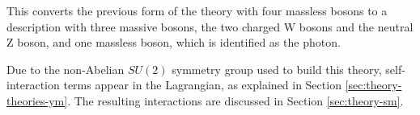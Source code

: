 This converts the previous form of the theory with four massless bosons to a
description with three massive bosons, the two charged W bosons and the
neutral Z boson, and one massless boson, which is identified as the photon.

Due to the non-Abelian $SU(2)$ symmetry group used to build this theory, 
self-interaction terms appear in the Lagrangian, as explained in Section
\ref{sec:theory-theories-ym}. The resulting interactions are discussed in
Section \ref{sec:theory-sm}.

